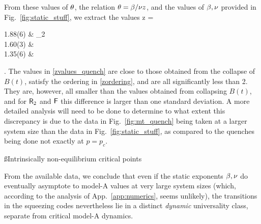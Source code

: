 \documentclass[pra,aps,twocolumn,groupedaddress,superscriptaddress,nofootinbib,preprintnumbers]{revtex4-2}
\begin{document}
	From these values of $\theta$, the relation $\theta = \beta / \nu z$, and the values of $\beta,\nu$ provided in Fig.~\ref{fig:static_stuff}, we extract the values 
	\be \label{zvalues_quench} z = \begin{dcases} 1.88(6) & \sfR_2 \\ 
	1.60(3) & \sfF\\ 
1.35(6) & \sfM \end{dcases}. \ee 
	The values in \eqref{zvalues_quench} are close to those obtained from the collapse of $B(t)$,  satisfy the ordering in \eqref{zordering}, and are all significantly less than 2. They are, however, all smaller than the values obtained from collapsing $B(t)$, and for $\mathsf{R}_2$ and $\mathsf{F}$ this difference is larger than one standard deviation. A more detailed analysis will need to be done to determine to what extent this discrepancy is due to the data in Fig.~\ref{fig:mt_quench} being taken at a larger system size than the data in Fig.~\ref{fig:static_stuff}, as compared to the quenches being done not exactly at $p=p_c$. 
	

	
%	

	
	\ss{Intrinsically non-equilibrium critical points}

	From the available data, we conclude that even if the static exponents $\beta,\nu$ do eventually asymptote to model-A values at very large system sizes (which, according to the analysis of App.~\ref{app:numerics}, seems unlikely), the transitions in the squeezing codes nevertheless lie in a distinct {\it dynamic} universality class, separate from critical model-A dynamics. 
		
\end{document}
